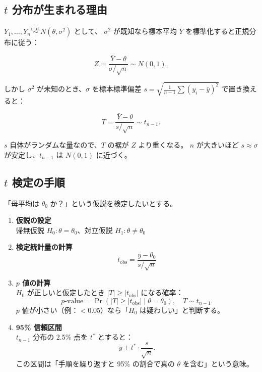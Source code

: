 \documentclass[12pt,a4paper]{ltjsarticle}
\begin{document}
\subsection{$t$ 分布が生まれる理由}

$Y_1, \ldots, Y_n \overset{\mathrm{i.i.d.}}{\sim} N(\theta, \sigma^2)$ として、
$\sigma^2$ が既知なら標本平均 $\bar{Y}$ を標準化すると正規分布に従う：

\[
  Z = \frac{\bar{Y} - \theta}{\sigma/\sqrt{n}} \sim N(0, 1).
\]

しかし $\sigma^2$ が未知のとき、$\sigma$ を標本標準偏差 $s = \sqrt{\frac{1}{n-1}\sum(y_i-\bar{y})^2}$ で置き換えると：

\[
  T = \frac{\bar{Y} - \theta}{s/\sqrt{n}} \sim t_{n-1}.
\]

$s$ 自体がランダムな量なので、$T$ の裾が $Z$ より重くなる。
$n$ が大きいほど $s \approx \sigma$ が安定し、$t_{n-1}$ は $N(0,1)$ に近づく。

\subsection{$t$ 検定の手順}

「母平均は $\theta_0$ か？」という仮説を検定したいとする。

\begin{enumerate}
  \item \textbf{仮説の設定}\\
    帰無仮説 $H_0\colon \theta = \theta_0$、対立仮説 $H_1\colon \theta \neq \theta_0$

  \item \textbf{検定統計量の計算}\\
    \[
      t_{\mathrm{obs}} = \frac{\bar{y} - \theta_0}{s/\sqrt{n}}
    \]

  \item \textbf{$p$ 値の計算}\\
    $H_0$ が正しいと仮定したとき $|T| \geq |t_{\mathrm{obs}}|$ になる確率：
    \[
      p\text{-value} = \Pr(|T| \geq |t_{\mathrm{obs}}| \mid \theta = \theta_0), \quad T \sim t_{n-1}.
    \]
    $p$ 値が小さい（例：$< 0.05$）なら「$H_0$ は疑わしい」と判断する。

  \item \textbf{95\% 信頼区間}\\
    $t_{n-1}$ 分布の 2.5\% 点を $t^*$ とすると：
    \[
      \bar{y} \pm t^* \cdot \frac{s}{\sqrt{n}}.
    \]
    この区間は「手順を繰り返すと 95\% の割合で真の $\theta$ を含む」という意味。
\end{enumerate}
\end{document}
